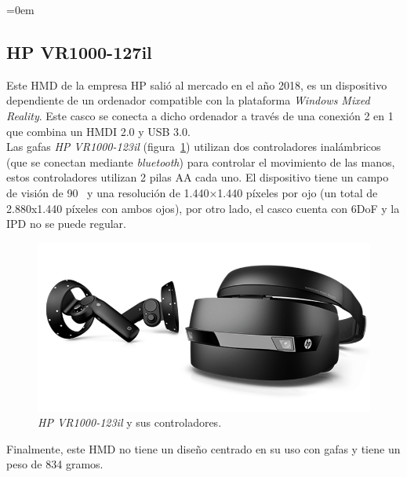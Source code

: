 \parindent=0em
\subsection{HP VR1000-127il}
\noindent

Este HMD de la empresa HP salió al mercado en el año 2018, es un dispositivo dependiente de un ordenador compatible con la plataforma \textit{Windows Mixed Reality}. Este casco se conecta a dicho ordenador a través de una conexión 2 en 1 que combina un HMDI 2.0 y USB 3.0. \\

Las gafas \textit{HP VR1000-123il} (figura~\ref{fig:hpvr1000}) utilizan dos controladores inalámbricos (que se conectan mediante \textit{bluetooth}) para controlar el movimiento de las manos, estos controladores utilizan 2 pilas AA cada uno. El dispositivo tiene un campo de visión de 90\degree~  y una resolución de 1.440×1.440 píxeles por ojo (un total de 2.880x1.440 píxeles con ambos ojos), por otro lado, el casco cuenta con 6DoF y la IPD no se puede regular. 

\begin{figure}[H]
    \centering
    \includegraphics[scale=0.5]{Images/Estado del arte/HP VR1000.png}
    \caption[\textit{HP VR1000-123il} y sus controladores]{\textit{HP VR1000-123il} y sus controladores\footnotemark.}
    \label{fig:hpvr1000}
\end{figure}

Finalmente, este HMD no tiene un diseño centrado en su uso con gafas y tiene un peso de 834 gramos. 